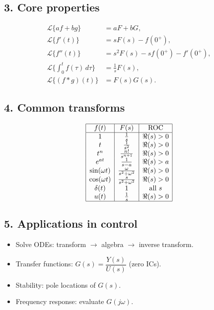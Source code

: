 \documentclass[12pt,a4paper]{article}
\begin{document}
	\subsection*{3. Core properties}
	\begin{align*}
		\mathcal{L}\{af+bg\} &= aF + bG, \\
		\mathcal{L}\{f'(t)\} &= sF(s) - f(0^+), \\
		\mathcal{L}\{f''(t)\} &= s^2F(s) - s f(0^+) - f'(0^+), \\
		\mathcal{L}\Big\{\int_0^t f(\tau)\,d\tau\Big\} &= \frac{1}{s}F(s), \\
		\mathcal{L}\{(f*g)(t)\} &= F(s)G(s).
	\end{align*}
	
	\subsection*{4. Common transforms}
	\[
	\begin{array}{|c|c|c|}
		\hline
		f(t) & F(s) & \text{ROC} \\
		\hline
		1 & \tfrac{1}{s} & \Re(s)>0 \\
		t & \tfrac{1}{s^2} & \Re(s)>0 \\
		t^n & \tfrac{n!}{s^{n+1}} & \Re(s)>0 \\
		e^{at} & \tfrac{1}{s-a} & \Re(s)>a \\
		\sin(\omega t) & \tfrac{\omega}{s^2+\omega^2} & \Re(s)>0 \\
		\cos(\omega t) & \tfrac{s}{s^2+\omega^2} & \Re(s)>0 \\
		\delta(t) & 1 & \text{all } s \\
		u(t) & \tfrac{1}{s} & \Re(s)>0 \\
		\hline
	\end{array}
	\]
	
	\subsection*{5. Applications in control}
	\begin{itemize}
		\item Solve ODEs: transform $\to$ algebra $\to$ inverse transform.
		\item Transfer functions: $G(s) = \dfrac{Y(s)}{U(s)}$ (zero ICs).
		\item Stability: pole locations of $G(s)$.
		\item Frequency response: evaluate $G(j\omega)$.
	\end{itemize}
	
\end{document}
